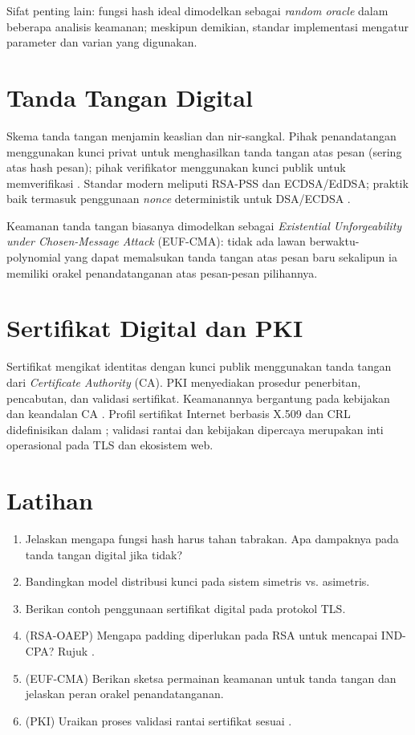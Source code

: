 \documentclass[../main.tex]{subfiles}
\begin{document}
Sifat penting lain: fungsi hash ideal dimodelkan sebagai \emph{random oracle} dalam beberapa analisis keamanan; meskipun demikian, standar implementasi mengatur parameter dan varian yang digunakan.

\section{Tanda Tangan Digital}
Skema tanda tangan menjamin keaslian dan nir-sangkal. Pihak penandatangan menggunakan kunci privat untuk menghasilkan tanda tangan atas pesan (sering atas hash pesan); pihak verifikator menggunakan kunci publik untuk memverifikasi \citep{katzlindell}. Standar modern meliputi RSA-PSS dan ECDSA/EdDSA; praktik baik termasuk penggunaan \emph{nonce} deterministik untuk DSA/ECDSA \citep{rfc8017,fips186-5,rfc6979}.

\begin{definition}
Keamanan tanda tangan biasanya dimodelkan sebagai \emph{Existential Unforgeability under Chosen-Message Attack} (EUF-CMA): tidak ada lawan berwaktu-polynomial yang dapat memalsukan tanda tangan atas pesan baru sekalipun ia memiliki orakel penandatanganan atas pesan-pesan pilihannya.
\end{definition}

\section{Sertifikat Digital dan PKI}
Sertifikat mengikat identitas dengan kunci publik menggunakan tanda tangan dari \emph{Certificate Authority} (CA). PKI menyediakan prosedur penerbitan, pencabutan, dan validasi sertifikat. Keamanannya bergantung pada kebijakan dan keandalan CA \citep{stallings}. Profil sertifikat Internet berbasis X.509 dan CRL didefinisikan dalam \citep{rfc5280}; validasi rantai dan kebijakan dipercaya merupakan inti operasional pada TLS dan ekosistem web.

\section{Latihan}
\begin{enumerate}
  \item Jelaskan mengapa fungsi hash harus tahan tabrakan. Apa dampaknya pada tanda tangan digital jika tidak?
  \item Bandingkan model distribusi kunci pada sistem simetris vs. asimetris.
  \item Berikan contoh penggunaan sertifikat digital pada protokol TLS.
  \item (RSA-OAEP) Mengapa padding diperlukan pada RSA untuk mencapai IND-CPA? Rujuk \citep{rfc8017}.
  \item (EUF-CMA) Berikan sketsa permainan keamanan untuk tanda tangan dan jelaskan peran orakel penandatanganan.
  \item (PKI) Uraikan proses validasi rantai sertifikat sesuai \citep{rfc5280}.
\end{enumerate}
\end{document}
